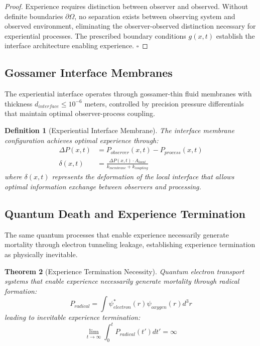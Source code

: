 \documentclass{article}
\newtheorem{theorem}{Theorem}[section]
\newtheorem{definition}[theorem]{Definition}
\begin{document}
\begin{proof}
Experience requires distinction between observer and observed. Without definite boundaries $\partial \Omega$, no separation exists between observing system and observed environment, eliminating the observer-observed distinction necessary for experiential processes. The prescribed boundary conditions $g(x,t)$ establish the interface architecture enabling experience. $\square$
\end{proof}

\subsection{Gossamer Interface Membranes}

The experiential interface operates through gossamer-thin fluid membranes with thickness $d_{interface} \leq 10^{-6}$ meters, controlled by precision pressure differentials that maintain optimal observer-process coupling.

\begin{definition}[Experiential Interface Membrane]
The interface membrane configuration achieves optimal experience through:
\begin{align}
\Delta P(x,t) &= P_{observer}(x,t) - P_{process}(x,t) \\
\delta(x,t) &= \frac{\Delta P(x,t) \cdot A_{local}}{k_{membrane} + k_{coupling}}
\end{align}
where $\delta(x,t)$ represents the deformation of the local interface that allows optimal information exchange between observers and processing.
\end{definition}

\subsection{Quantum Death and Experience Termination}

The same quantum processes that enable experience necessarily generate mortality through electron tunneling leakage, establishing experience termination as physically inevitable.

\begin{theorem}[Experience Termination Necessity]
Quantum electron transport systems that enable experience necessarily generate mortality through radical formation:
$$P_{radical} = \int \psi_{electron}^*(r) \psi_{oxygen}(r) d^3r$$
leading to inevitable experience termination:
$$\lim_{t \rightarrow \infty} \int_0^t P_{radical}(t') dt' = \infty$$
\end{theorem}
\end{document}
